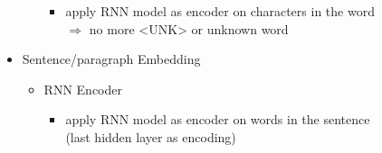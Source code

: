 \begin{itemize}
\begin{itemize}
		\begin{itemize}
		\item apply RNN model as encoder on characters in the word \\
		$\Rightarrow$ no more <UNK> or unknown word
		\end{itemize}
	\end{itemize}
\item Sentence/paragraph Embedding
	\begin{itemize}
	\item RNN Encoder
		\begin{itemize}
		\item apply RNN model as encoder on words in the sentence \\ 
		(last hidden layer as encoding)
		\end{itemize}
	\end{itemize}
\end{itemize}

